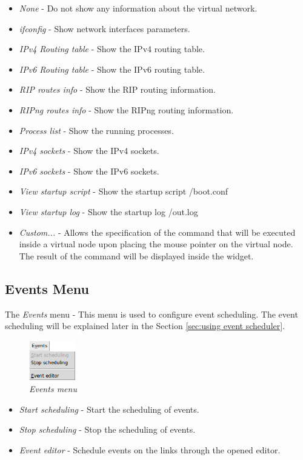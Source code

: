 \begin{itemize}
 \item \emph{None} - Do not show any information about the virtual network.
 \item \emph{ifconfig} - Show network interfaces parameters.
 \item \emph{IPv4 Routing table} - Show the IPv4 routing table.
 \item \emph{IPv6 Routing table} - Show the IPv6 routing table.
 \item \emph{RIP routes info} - Show the RIP routing information.
 \item \emph{RIPng routes info} - Show the RIPng routing information.
 \item \emph{Process list} - Show the running processes.
 \item \emph{IPv4 sockets} - Show the IPv4 sockets.
 \item \emph{IPv6 sockets} - Show the IPv6 sockets.
 \item \emph{View startup script} - Show the startup script /boot.conf
 \item \emph{View startup log} - Show the startup log /out.log
 \item \emph{Custom...} - Allows the specification of the command that will be
executed inside a virtual node upon placing the mouse pointer on the virtual
node. The result of the command will be displayed inside the widget. 
 \end{itemize}

 \subsection{Events Menu}
 The \emph{Events} menu - This menu is used to configure event scheduling. The
 event scheduling will be explained later in the Section
 \ref{sec:using event scheduler}.

 \begin{figure}[H]
  \centering
  \vspace{10pt}
  \includegraphics[width=0.18\textwidth]{./images/events_menu.png}
  \caption{\emph{Events menu}}
  \label{fig:events_menu}
  \end{figure}

 \begin{itemize}
 \item \emph{Start scheduling} - Start the scheduling of events.
 \item \emph{Stop scheduling} - Stop the scheduling of events.
 \item \emph{Event editor} - Schedule events on the links through the opened
editor.
 \end{itemize}

